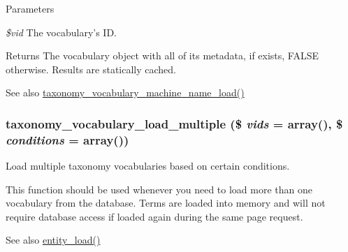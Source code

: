 \begin{DoxyParams}{Parameters}
\item[{\em \$vid}]The vocabulary's ID.\end{DoxyParams}
\begin{DoxyReturn}{Returns}
The vocabulary object with all of its metadata, if exists, FALSE otherwise. Results are statically cached.
\end{DoxyReturn}
\begin{DoxySeeAlso}{See also}
\hyperlink{taxonomy_8module_ae25133c12d174817672953ce9d0b297e}{taxonomy\_\-vocabulary\_\-machine\_\-name\_\-load()} 
\end{DoxySeeAlso}
\hypertarget{taxonomy_8module_aedb1343599759686a2701b067b75e1ea}{
\subsubsection[{taxonomy\_\-vocabulary\_\-load\_\-multiple}]{\setlength{\rightskip}{0pt plus 5cm}taxonomy\_\-vocabulary\_\-load\_\-multiple (\$ {\em vids} = {\ttfamily array()}, \/  \$ {\em conditions} = {\ttfamily array()})}}
\label{taxonomy_8module_aedb1343599759686a2701b067b75e1ea}
Load multiple taxonomy vocabularies based on certain conditions.

This function should be used whenever you need to load more than one vocabulary from the database. Terms are loaded into memory and will not require database access if loaded again during the same page request.

\begin{DoxySeeAlso}{See also}
\hyperlink{common_8inc_a78b89cf93f9710a68d02f86adccf1898}{entity\_\-load()}
\end{DoxySeeAlso}

